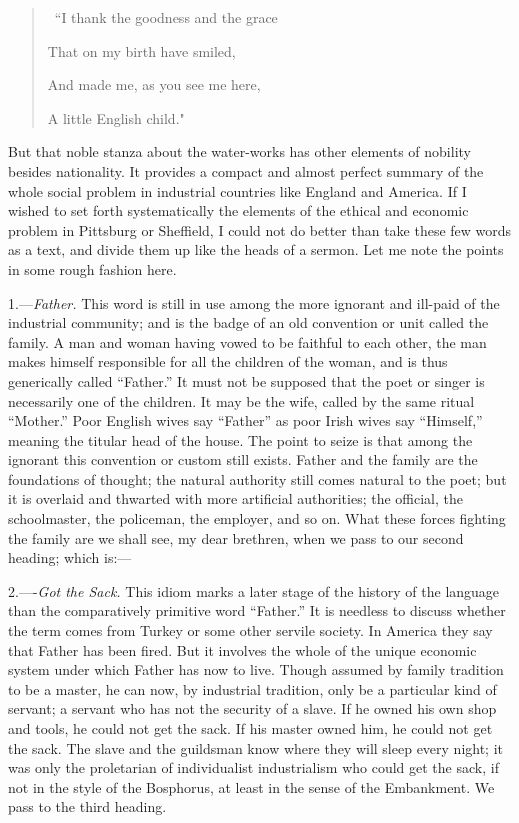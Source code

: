\documentclass{book}
\begin{document}
\begin{quotation}\
	“I thank the goodness and the grace

	That on my birth have smiled,

	And made me, as you see me here,

	A little English child."
\end{quotation}

But that noble stanza about the water-works has other elements of nobility besides nationality. It provides a compact and almost perfect summary of the whole social problem in industrial countries like England and America. If I wished to set forth systematically the elements of the ethical and economic problem in Pittsburg or Sheffield, I could not do better than take these few words as a text, and divide them up like the heads of a sermon. Let me note the points in some rough fashion here.

1.—\emph{Father.} This word is still in use among the more ignorant and ill-paid of the industrial community; and is the badge of an old convention or unit called the family. A man and woman having vowed to be faithful to each other, the man makes himself responsible for all the children of the woman, and is thus generically called “Father.” It must not be supposed that the poet or singer is necessarily one of the children. It may be the wife, called by the same ritual “Mother.” Poor English wives say “Father” as poor Irish wives say “Himself,” meaning the titular head of the house. The point to seize is that among the ignorant this convention or custom still exists. Father and the family are the foundations of thought; the natural authority still comes natural to the poet; but it is overlaid and thwarted with more artificial authorities; the official, the schoolmaster, the policeman, the employer, and so on. What these forces fighting the family are we shall see, my dear brethren, when we pass to our second heading; which is:—

2.—-\emph{Got the Sack.} This idiom marks a later stage of the history of the language than the comparatively primitive word “Father.” It is needless to discuss whether the term comes from Turkey or some other servile society. In America they say that Father has been fired. But it involves the whole of the unique economic system under which Father has now to live. Though assumed by family tradition to be a master, he can now, by industrial tradition, only be a particular kind of servant; a servant who has not the security of a slave. If he owned his own shop and tools, he could not get the sack. If his master owned him, he could not get the sack. The slave and the guildsman know where they will sleep every night; it was only the proletarian of individualist industrialism who could get the sack, if not in the style of the Bosphorus, at least in the sense of the Embankment. We pass to the third heading.
\end{document}
